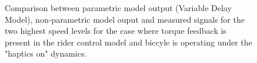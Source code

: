 \begin{figure}
    \centering
    \begin{subfigure}[b]{\textwidth}
        \centering
        \caption{}
        \label{fig:dm_fit3}
    \end{subfigure}
    \begin{subfigure}[b]{\textwidth}
        \centering
        \caption{}
        \label{fig:dm_fit4}
    \end{subfigure}
    
    \caption{Comparison between parametric model output (Variable Delay Model), non-parametric model ouput and measured signals for the two highest speed levels for the case where torque feedback is present in the rider control model and biccyle is operating under the "haptics on" dynamics.}
    \label{fig:dm_fitB}
 \end{figure}

